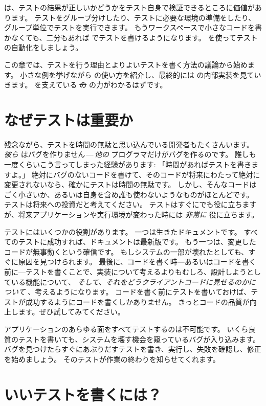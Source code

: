 \documentclass[a4paper,10pt,twoside]{book}
\begin{document}
\sunit は、テストの結果が正しいかどうかをテスト自身で検証できるところに価値があります。
テストをグループ分けしたり、テストに必要な環境の準備をしたり、グループ単位でテストを実行できます。
もうワークスペースで小さなコードを書かなくても、二分もあれば \sunit でテストを書けるようになります。
\sunit を使ってテストの自動化をしましょう。

この章では、テストを行う理由とよりよいテストを書く方法の議論から始めます。
小さな例を挙げながら \sunit の使い方を紹介し、最終的には \sunit の内部実装を見ていきます。
\sunit を支えている \st の  の力がわかるはずです。

\section{なぜテストは重要か}

残念ながら、テストを時間の無駄と思い込んでいる開発者もたくさんいます。
\emph{彼ら} はバグを作りません\,---\,\emph{他の} プログラマだけがバグを作るのです。
誰しも一度くらいこう言ってしまった経験があります: 「時間があればテストを書きますよ。」
絶対にバグのないコードを書けて、そのコードが将来にわたって絶対に変更されないなら、確かにテストは時間の無駄です。
しかし、そんなコードはごく小さいか、あるいは自身を含め誰も使わないようなものがほとんどです。
テストは将来への投資だと考えてください。
テストはすぐにでも役に立ちますが、将来アプリケーションや実行環境が変わった時には \emph{非常に} 役に立ちます。

テストにはいくつかの役割があります。
一つは生きたドキュメントです。
すべてのテストに成功すれば、ドキュメントは最新版です。
もう一つは、変更したコードが無事動くという確信です。
もしシステムの一部が壊れたとしても、すぐに原因を見つけられます。
最後に、コードを書く時---あるいはコードを書く前に---テストを書くことで、実装について考えるよりもむしろ、設計しようとしている機能について、 \emph{そして、それをどうクライアントコードに見せるのかについて} 、考えるようになります。
コードを書く前にテストを書いておけば、テストが成功するようにコードを書くしかありません。
きっとコードの品質が向上します。ぜひ試してみてください。

アプリケーションのあらゆる面をすべてテストするのは不可能です。
いくら良質のテストを書いても、システムを壊す機会を窺っているバグが入り込みます。
バグを見つけたらすぐにあぶりだすテストを書き、実行し、失敗を確認し、修正を始めましょう。
そのテストが作業の終わりを知らせてくれます。

\section{いいテストを書くには？}
\end{document}
